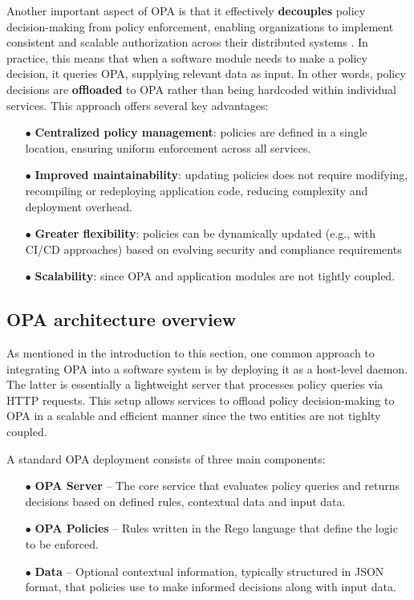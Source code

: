 Another important aspect of OPA is that it effectively \textbf{decouples} policy decision-making from policy enforcement, enabling organizations to implement consistent and scalable authorization across their distributed systems \cite{test}.
In practice, this means that when a software module needs to make a policy decision, it queries OPA, supplying relevant data as input. In other words, policy decisions are \textbf{offloaded} to OPA rather than being hardcoded within individual services. This approach offers several key advantages:
\begin{itemize}[itemsep=0.2pt, topsep=1pt]
  \item[$\bullet$] \textbf{Centralized policy management}: policies are defined in a single location, ensuring uniform enforcement across all services.
  \item[$\bullet$] \textbf{Improved maintainability}: updating policies does not require modifying, recompiling or redeploying application code, reducing complexity and deployment overhead.
  \item[$\bullet$] \textbf{Greater flexibility}: policies can be dynamically updated (e.g., with CI/CD approaches) based on evolving security and compliance requirements 
  \item[$\bullet$] \textbf{Scalability}: since OPA and application modules are not tightly coupled.
\end{itemize} 




\subsection{OPA architecture overview}

As mentioned in the introduction to this section, one common approach to integrating OPA into a software system is by deploying it as a host-level daemon. The latter is essentially a lightweight server that processes policy queries via HTTP requests. This setup allows services to offload policy decision-making to OPA in a scalable and efficient manner since the two entities are not tighlty coupled.

A standard OPA deployment consists of three main components:

\begin{itemize}[itemsep=0.2pt, topsep=1pt]
\item[$\bullet$] \textbf{OPA Server} – The core service that evaluates policy queries and returns decisions based on defined rules, contextual data and input data.
\item[$\bullet$] \textbf{OPA Policies} – Rules written in the Rego language that define the logic to be enforced.
\item[$\bullet$] \textbf{Data} – Optional contextual information, typically structured in JSON format, that policies use to make informed decisions along with input data.
\end{itemize}

